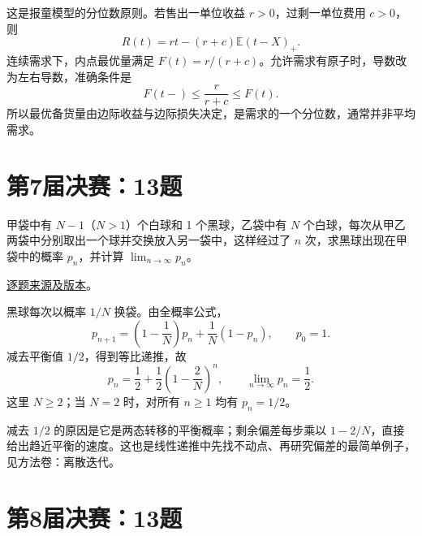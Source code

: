 \documentclass[UTF8,12pt,a4paper,fontset=fandol]{ctexbook}
\begin{document}
\begin{remark}[方法与条件]

这是报童模型的分位数原则。若售出一单位收益 $r>0$，过剩一单位费用 $c>0$，则
\[
R(t)=rt-(r+c)\mathbb E(t-X)_+.
\]
连续需求下，内点最优量满足 $F(t)=r/(r+c)$。允许需求有原子时，导数改为左右导数，准确条件是
\[
F(t-)\le\frac r{r+c}\le F(t).
\]
所以最优备货量由边际收益与边际损失决定，是需求的一个分位数，通常并非平均需求。

\end{remark}

\section{第7届决赛：13题}\label{pr:fin07-hi:13}

\begin{example}[公开题解转录]\label{q:fin07-hi:13}

甲袋中有 $N-1$（$N>1$）个白球和 1 个黑球，乙袋中有 $N$ 个白球，每次从甲乙两袋中分别取出一个球并交换放入另一袋中，这样经过了 $n$ 次，求黑球出现在甲袋中的概率 $p_{n}$，并计算 $\lim_{n\to\infty}p_{n}$。

\end{example}

\href{https://github.com/lzxcr/cmc-mathematics/blob/64916fa1fdbc3e444a652eca204d5669058ee321/src/problems/finals/07/15.md}{逐题来源及版本}。

\begin{solve}

黑球每次以概率 $1/N$ 换袋。由全概率公式，
\[
p_{n+1}=\left(1-\frac1N\right)p_n+\frac1N(1-p_n),\qquad p_0=1.
\]
减去平衡值 $1/2$，得到等比递推，故
\[
p_n=\frac12+\frac12\left(1-\frac2N\right)^n,\qquad \lim_{n\to\infty}p_n=\frac12.
\]
这里 $N\geq2$；当 $N=2$ 时，对所有 $n\geq1$ 均有 $p_n=1/2$。

\end{solve}

\begin{remark}[方法与条件]

减去 $1/2$ 的原因是它是两态转移的平衡概率；剩余偏差每步乘以 $1-2/N$，直接给出趋近平衡的速度。这也是线性递推中先找不动点、再研究偏差的最简单例子，见方法卷：离散迭代。

\end{remark}

\section{第8届决赛：13题}\label{pr:fin08-hi:13}
\end{document}
